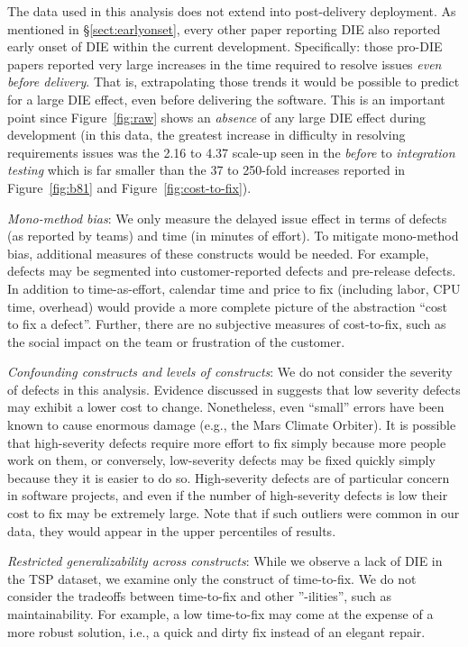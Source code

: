 \documentclass[smallcondensed]{svjour3}
\newcommand{\tion}[1]{\S\ref{sect:#1}}
\newcommand{\fig}[1]{Figure~\ref{fig:#1}}
\begin{document}
The data used in this analysis does not extend into post-delivery deployment. As mentioned in \tion{earlyonset}, every other
paper reporting DIE also reported  early onset of DIE
within the current development. Specifically: those pro-DIE papers reported very large
increases in the time required to resolve issues {\em even before delivery}. That is, extrapolating those
trends it would be possible to predict for a large DIE effect, even before delivering the software.
This is an important point since  Figure~\ref{fig:raw} shows an {\em absence}
of any  large DIE effect during development
(in this data, the greatest increase in difficulty in resolving requirements issues was the 2.16 to 4.37
scale-up seen in the {\em before} to {\em integration testing} 
which is far smaller than the 37 to 250-fold increases reported in \fig{b81} and \fig{cost-to-fix}).  



\textit{Mono-method bias}: We only measure the delayed issue effect in terms of defects (as reported by teams) and time (in minutes of effort). To mitigate mono-method bias, additional measures of these constructs would be needed. For example, defects may be segmented into customer-reported defects and pre-release defects. In addition to time-as-effort, calendar time and price to fix (including labor, CPU time, overhead) would provide a more complete picture of the abstraction ``cost to fix a defect''. Further, there are no subjective measures of cost-to-fix, such as the social impact on the team or frustration of the customer.

\textit{Confounding constructs and levels of constructs}: We do not consider the severity of defects in this analysis. Evidence discussed in \cite{Shull02} suggests that low severity defects may exhibit a lower cost to change. Nonetheless, even ``small'' errors have been known to cause enormous damage (e.g., the Mars Climate Orbiter). It is possible that high-severity defects require more effort to fix simply because more people work on them, or conversely, low-severity defects may be fixed quickly simply because they it is easier to do so. High-severity defects are of particular concern in software projects, and even if the number of high-severity defects is low their cost to fix may be extremely large. Note that if such outliers were common in our data, they would appear in the upper percentiles of results. 

\textit{Restricted generalizability across constructs}: While we observe a lack of DIE in the TSP dataset, we examine only the construct of time-to-fix. We do not consider the tradeoffs between time-to-fix and other ''-ilities'', such as maintainability. For example, a low time-to-fix may come at the expense of a more robust solution, i.e., a quick and dirty fix instead of an elegant repair.
\end{document}
